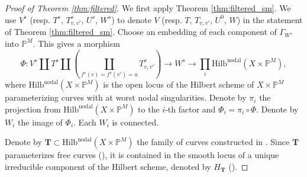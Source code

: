 \documentclass{amsart}
\theoremstyle{definition}
\theoremstyle{remark}
\newcommand{\mbb}{\mathbb}
\newcommand{\PP}{\mbb{P}}
\begin{document}
\begin{proof}[Proof of Theorem \ref{thm:filtered}]
     We first apply Theorem \ref{thm:filtered_sm}.
     We use $V^s$ (resp. $T^s$, $T^s_{v,v'}$, $U^s$, $W^s$) to denote $V$ (resp. $T$, $T_{v, v'}$, $U^0$, $W$) in the statement of Theorem \ref{thm:filtered_sm}.
     Choose an embedding of each component of $\Gamma_{W^s}$ into $\PP^M$.
     This gives a morphism
     \[
     \Phi: V^s \coprod T^s \coprod (\coprod_{f^s(v)=f^s(v')=u} T^s_{v,v'}) \to W^s \to  \prod_i \text{Hilb}^\text{nodal}(X \times \PP^M),
    \]
    where $\text{Hilb}^\text{nodal}(X \times \PP^M)$ is the open locus of the Hilbert scheme of $X \times \PP^M$ parameterizing curves with at worst nodal singularities.
    Denote by $\pi_i$ the  projection from $\text{Hilb}^\text{nodal}(X \times \PP^M)$ to the $i$-th factor and $\Phi_i=\pi_i \circ \Phi$.
    Denote by $W_i$ the image of $\Phi_i$. 
    Each $W_i$ is connected.
    
    Denote by $\mathbf{T} \subset \text{Hilb}^\text{nodal}(X \times \PP^M)$ the family of curves constructed in \cite[Theorem 44]{Kollar_Tian}.
    Since $\mathbf{T}$ parameterizes free curves (\cite[(41.2)]{Kollar_Tian}), it is contained in the smooth locus of a unique irreducible component of the Hilbert scheme, denoted by $H_\mathbf{T}$ (\cite[Claim 41.4]{Kollar_Tian}).
    

\end{proof}
\end{document}
